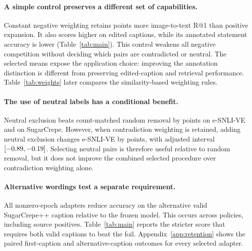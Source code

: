 \paragraph{A simple control preserves a different set of capabilities.}
Constant negative weighting retains \ConstantExpandedRetrievalGain{} points more image-to-text R@1 than positive expansion. It also scores higher on edited captions, while its annotated statement accuracy is lower (Table~\ref{tab:main}). This control weakens all negative competition without deciding which pairs are contradicted or neutral. The selected means expose the application choice: improving the annotation distinction is different from preserving edited-caption and retrieval performance. Table~\ref{tab:weights} later compares the similarity-based weighting rules.

\paragraph{The use of neutral labels has a conditional benefit.}
Neutral exclusion beats count-matched random removal by \NeutralRandomRelationGain{} points on e-SNLI-VE and \NeutralRandomSugarGain{} on SugarCrepe. However, when contradiction weighting is retained, adding neutral exclusion changes e-SNLI-VE by \NeutralUnderHardeningDelta{} points, with adjusted interval $[-0.89,-0.19]$. Selecting neutral pairs is therefore useful relative to random removal, but it does not improve the combined selected procedure over contradiction weighting alone.

\paragraph{Alternative wordings test a separate requirement.}
All \NonzeroAdapterCount{} nonzero-epoch adapters reduce accuracy on the alternative valid SugarCrepe++ caption relative to the frozen model. This occurs across policies, including source positives. Table~\ref{tab:main} reports the stricter score that requires both valid captions to beat the foil. Appendix~\ref{app:retention} shows the paired first-caption and alternative-caption outcomes for every selected adapter.
